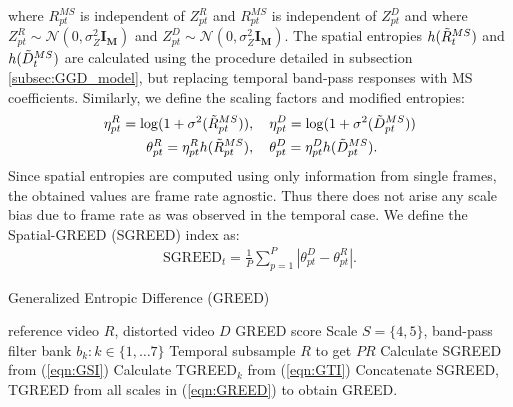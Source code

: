 \documentclass[journal]{IEEEtran}
\begin{document}
where $R_{pt}^{MS}$ is independent of $Z_{pt}^R$ and $R_{pt}^{MS}$ is independent of $Z_{pt}^D$ and where $Z_{pt}^R \sim \mathcal{N}(0,\sigma_Z ^2 \mathbf{I_M})$ and $Z_{pt}^D \sim \mathcal{N}(0,\sigma_Z ^2 \mathbf{I_M})$. The spatial entropies $h(\Tilde{R}_t ^{MS})$ and $h(\Tilde{D}_t ^{MS})$ are calculated using the procedure detailed in subsection \ref{subsec:GGD_model}, but replacing temporal band-pass responses with MS coefficients. Similarly, we define the scaling factors and modified entropies:
\begin{align}
\begin{aligned}
    \eta_{pt} ^R = \log(1+\sigma^2(\Tilde{R}_{pt}^{MS}))&, \quad \eta_{pt}^D = \log(1+\sigma^2(\Tilde{D}_{pt}^{MS})) \\
\theta_{pt} ^R = \eta_{pt} ^R h(\Tilde{R}_{pt}^{MS})&, \quad \theta_{pt} ^D = \eta_{pt} ^D h(\Tilde{D}_{pt}^{MS}).
    \label{eqn:spatial_entropy_scaled}
    \end{aligned}
\end{align}
Since spatial entropies are computed using only information from single frames, the obtained values are frame rate agnostic. Thus there does not arise any scale bias due to frame rate as was observed in the temporal case. We define the Spatial-GREED (SGREED) index as:
\begin{align}
    \text{SGREED}_t = \frac{1}{P}\sum_{p=1} ^P |\theta_{pt} ^D - \theta_{pt} ^R|.
    \label{eqn:GSI}
\end{align}

\begin{algorithm}[t] \caption{Generalized Entropic Difference (GREED)}
\begin{algorithmic}[1]
\Require reference video $R$, distorted video $D$
\Ensure GREED score
\State Scale $S = \{4,5\}$, band-pass filter bank $b_k: k \in \{1,\ldots 7\}$
\State Temporal subsample $R$ to get $PR$
\State Calculate SGREED from (\ref{eqn:GSI})
\State Calculate TGREED$_k$ from (\ref{eqn:GTI})
\EndFor
\EndFor
\State Concatenate SGREED, TGREED from all scales in (\ref{eqn:GREED}) to obtain GREED.
\end{algorithmic}
\label{alg1}
\end{algorithm}
\end{document}
